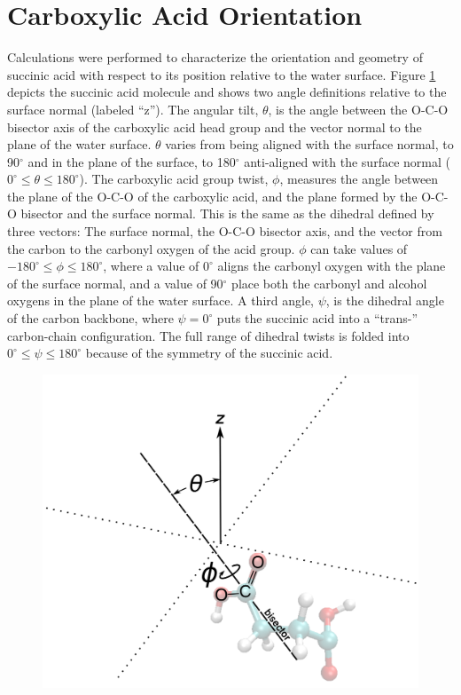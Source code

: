 \section {Carboxylic Acid Orientation}

Calculations were performed to characterize the orientation and geometry of succinic acid with respect to its position relative to the water surface. Figure \ref{fig:angle-definitions} depicts the succinic acid molecule and shows two angle definitions relative to the surface normal (labeled ``z''). The angular tilt, $\theta$, is the angle between the O-C-O bisector axis of the carboxylic acid head group and the vector normal to the plane of the water surface. $\theta$ varies from being aligned with the surface normal, to 90$^{\circ}$ and in the plane of the surface, to 180$^{\circ}$ anti-aligned with the surface normal ($0^{\circ} \le \theta \le 180^{\circ}$). The carboxylic acid group twist, $\phi$, measures the angle between the plane of the O-C-O of the carboxylic acid, and the plane formed by the O-C-O bisector and the surface normal. This is the same as the dihedral defined by three vectors: The surface normal, the O-C-O bisector axis, and the vector from the carbon to the carbonyl oxygen of the acid group. $\phi$ can take values of $-180^{\circ} \le \phi \le 180^{\circ}$, where a value of $0^{\circ}$ aligns the carbonyl oxygen with the plane of the surface normal, and a value of 90$^{\circ}$ place both the carbonyl and alcohol oxygens in the plane of the water surface. A third angle, $\psi$, is the dihedral angle of the carbon backbone, where $\psi = 0^{\circ}$ puts the succinic acid into a ``trans-'' carbon-chain configuration. The full range of dihedral twists is folded into $0^{\circ} \le \psi \le 180^{\circ}$ because of the symmetry of the succinic acid. 

\begin{figure}[h!]
	\begin{center}
		\includegraphics[scale=1.0]{images/bond-angles/bond-angle-definitions-small.png}
		\caption{}
		\label{fig:angle-definitions}
	\end{center}
\end{figure}

